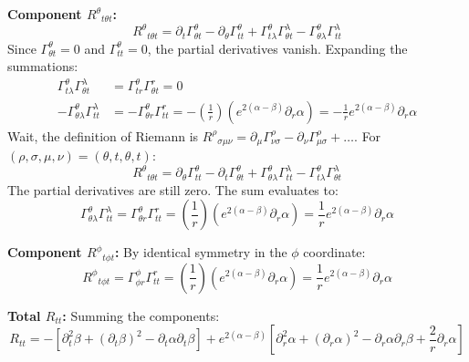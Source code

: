 \documentclass[11pt, a4paper]{report}
\begin{document}
\textbf{Component ${R^\theta}_{t\theta t}$:}
\begin{equation}
    {R^\theta}_{t\theta t} = \partial_t \Gamma^\theta_{\theta t} - \partial_\theta \Gamma^\theta_{tt} + \Gamma^\theta_{t\lambda}\Gamma^\lambda_{\theta t} - \Gamma^\theta_{\theta\lambda}\Gamma^\lambda_{tt}
\end{equation}
Since $\Gamma^\theta_{\theta t} = 0$ and $\Gamma^\theta_{tt} = 0$, the partial derivatives vanish. Expanding the summations:
\begin{align}
    \Gamma^\theta_{t\lambda}\Gamma^\lambda_{\theta t} &= \Gamma^\theta_{tr}\Gamma^r_{\theta t} = 0 \\
    -\Gamma^\theta_{\theta\lambda}\Gamma^\lambda_{tt} &= -\Gamma^\theta_{\theta r}\Gamma^r_{tt} = -\left(\frac{1}{r}\right) \left( e^{2(\alpha - \beta)} \partial_r \alpha \right) = -\frac{1}{r} e^{2(\alpha - \beta)} \partial_r \alpha
\end{align}
Wait, the definition of Riemann is ${R^\rho}_{\sigma\mu\nu} = \partial_\mu \Gamma^\rho_{\nu\sigma} - \partial_\nu \Gamma^\rho_{\mu\sigma} + \dots$. For $(\rho, \sigma, \mu, \nu) = (\theta, t, \theta, t)$:
\begin{equation}
    {R^\theta}_{t\theta t} = \partial_\theta \Gamma^\theta_{tt} - \partial_t \Gamma^\theta_{\theta t} + \Gamma^\theta_{\theta\lambda}\Gamma^\lambda_{tt} - \Gamma^\theta_{t\lambda}\Gamma^\lambda_{\theta t}
\end{equation}
The partial derivatives are still zero. The sum evaluates to:
\begin{equation}
    \Gamma^\theta_{\theta\lambda}\Gamma^\lambda_{tt} = \Gamma^\theta_{\theta r}\Gamma^r_{tt} = \left(\frac{1}{r}\right) \left( e^{2(\alpha - \beta)} \partial_r \alpha \right) = \frac{1}{r} e^{2(\alpha - \beta)} \partial_r \alpha
\end{equation}

\textbf{Component ${R^\phi}_{t\phi t}$:}
By identical symmetry in the $\phi$ coordinate:
\begin{equation}
    {R^\phi}_{t\phi t} = \Gamma^\phi_{\phi r}\Gamma^r_{tt} = \left(\frac{1}{r}\right) \left( e^{2(\alpha - \beta)} \partial_r \alpha \right) = \frac{1}{r} e^{2(\alpha - \beta)} \partial_r \alpha
\end{equation}

\textbf{Total $R_{tt}$:}
Summing the components:
\begin{equation}
    R_{tt} = - \left[ \partial_t^2 \beta + (\partial_t \beta)^2 - \partial_t \alpha \partial_t \beta \right] + e^{2(\alpha - \beta)} \left[ \partial_r^2 \alpha + (\partial_r \alpha)^2 - \partial_r \alpha \partial_r \beta + \frac{2}{r} \partial_r \alpha \right]
\end{equation}
\end{document}
